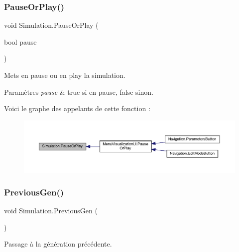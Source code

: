 \subsubsection{\texorpdfstring{Pause\+Or\+Play()}{PauseOrPlay()}}
{\footnotesize\ttfamily void Simulation.\+Pause\+Or\+Play (\begin{DoxyParamCaption}\item[{bool}]{pause }\end{DoxyParamCaption})\hspace{0.3cm}{\ttfamily [inline]}}



Mets en pause ou en play la simulation. 


\begin{DoxyParams}{Paramètres}
{\em pause} & true si en pause, false sinon.\\
\hline
\end{DoxyParams}
Voici le graphe des appelants de cette fonction \+:
\nopagebreak
\begin{figure}[H]
\begin{center}
\leavevmode
\includegraphics[width=350pt]{class_simulation_ab668bfea667549d1295fc55f5ccfbc4a_icgraph}
\end{center}
\end{figure}
\mbox{\label{class_simulation_a2af29808f03940f4a8824c926f8c8cf9}} 
\subsubsection{\texorpdfstring{Previous\+Gen()}{PreviousGen()}}
{\footnotesize\ttfamily void Simulation.\+Previous\+Gen (\begin{DoxyParamCaption}{ }\end{DoxyParamCaption})\hspace{0.3cm}{\ttfamily [inline]}}



Passage à la génération précédente. 

